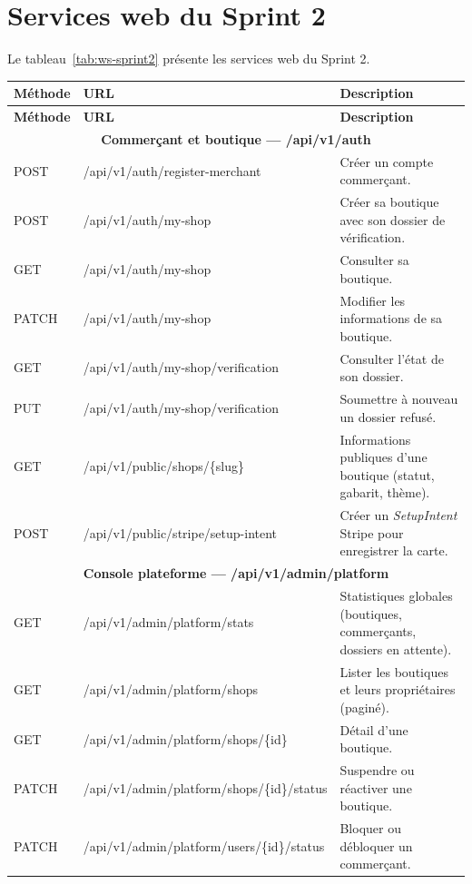 \section{Services web du Sprint 2}
Le tableau~\ref{tab:ws-sprint2} présente les services web du Sprint 2.
\renewcommand{\arraystretch}{1.15}
\setlength{\tabcolsep}{4pt}
\begin{longtable}{|p{1.5cm}|p{6.8cm}|p{6.2cm}|}
\hline
\textbf{Méthode} & \textbf{URL} & \textbf{Description} \\
\hline
\endfirsthead
\hline
\textbf{Méthode} & \textbf{URL} & \textbf{Description} \\
\hline
\endhead
\multicolumn{3}{|c|}{\textbf{Commerçant et boutique --- /api/v1/auth}} \\
\hline
POST & /api/v1/auth/register-merchant & Créer un compte commerçant. \\
\hline
POST & /api/v1/auth/my-shop & Créer sa boutique avec son dossier de vérification. \\
\hline
GET & /api/v1/auth/my-shop & Consulter sa boutique. \\
\hline
PATCH & /api/v1/auth/my-shop & Modifier les informations de sa boutique. \\
\hline
GET & /api/v1/auth/my-shop/verification & Consulter l'état de son dossier. \\
\hline
PUT & /api/v1/auth/my-shop/verification & Soumettre à nouveau un dossier refusé. \\
\hline
GET & /api/v1/public/shops/\{slug\} & Informations publiques d'une boutique (statut, gabarit, thème). \\
\hline
POST & /api/v1/public/stripe/setup-intent & Créer un \textit{SetupIntent} Stripe pour enregistrer la carte. \\
\hline
\multicolumn{3}{|c|}{\textbf{Console plateforme --- /api/v1/admin/platform}} \\
\hline
GET & /api/v1/admin/platform/stats & Statistiques globales (boutiques, commerçants, dossiers en attente). \\
\hline
GET & /api/v1/admin/platform/shops & Lister les boutiques et leurs propriétaires (paginé). \\
\hline
GET & /api/v1/admin/platform/shops/\{id\} & Détail d'une boutique. \\
\hline
PATCH & /api/v1/admin/platform/shops/\{id\}/status & Suspendre ou réactiver une boutique. \\
\hline
PATCH & /api/v1/admin/platform/users/\{id\}/status & Bloquer ou débloquer un commerçant. \\

\end{longtable}
